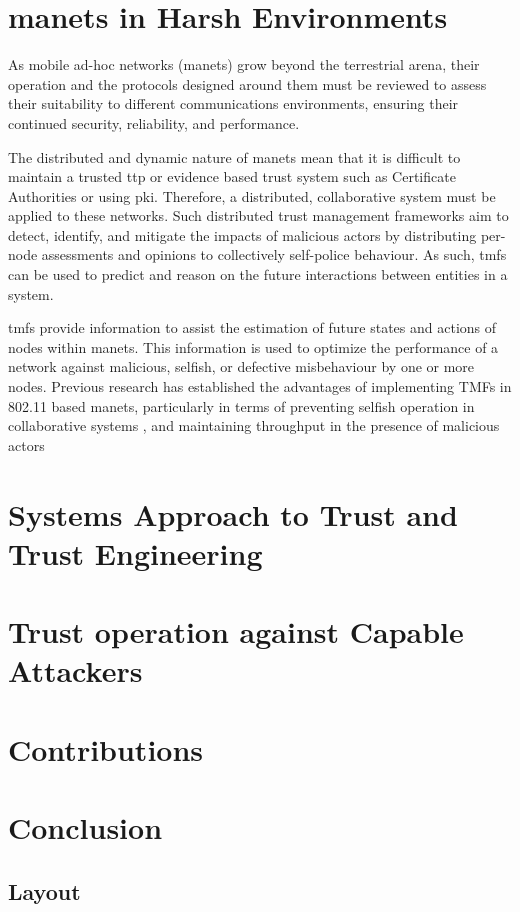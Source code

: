 \section{\glspl{manet} in Harsh Environments}

As mobile ad-hoc networks (\gls{manet}s) grow beyond the terrestrial arena, their operation and the protocols designed around them must be reviewed to assess their suitability to different communications environments, ensuring their continued security, reliability, and performance.

The distributed and dynamic nature of \glspl{manet} mean that it is difficult to maintain a trusted \gls{ttp} or evidence based trust system such as Certificate Authorities or using \gls{pki}.
Therefore, a distributed, collaborative system must be applied to these networks.
Such distributed trust management frameworks aim to detect, identify, and mitigate the impacts of malicious actors by distributing per-node assessments and opinions to collectively self-police behaviour.
As such, \glspl{tmf} can be used to predict and reason on the future interactions between entities in a system.

\glspl{tmf} provide information to assist the estimation of future states and actions of nodes within \glspl{manet}.
This information is used to optimize the performance of a network against malicious, selfish, or defective misbehaviour by one or more nodes.
Previous research has established the advantages of implementing TMFs in 802.11 based \glspl{manet}, particularly in terms of preventing selfish operation in collaborative systems \cite{Li2007}, and maintaining throughput in the presence of malicious actors \cite{Buchegger2002}

\section{Systems Approach to Trust and Trust Engineering}

\section{Trust operation against Capable Attackers}


\section{Contributions}



\section{Conclusion}
\subsection{Layout}

\ifx\ifthesis\undefined
	
\fi

